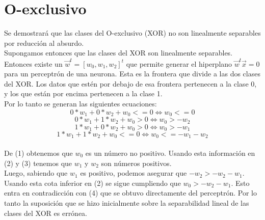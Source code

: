 \documentclass[a4paper]{article}
\begin{document}
\section{O-exclusivo}
Se demostrará que las clases del O-exclusivo (XOR) no son linealmente separables por reducción al absurdo.\\

Supongamos entonces que las clases del XOR son linealmente separables. Entonces existe un $\vec{w}^{t} = [w_{0}, w_{1}, w_{2}]^{t}$ que permite generar el hiperplano $\vec{w}^{t}\vec{x} = 0$ para un perceptrón de una neurona. Esta es la frontera que divide a las dos clases del XOR. Los datos que estén por debajo de esa frontera pertenecen a la clase 0, y los que están por encima pertenecen a la clase 1.\\

Por lo tanto se generan las siguientes ecuaciones:\\
\begin{equation}
0*w_{1} + 0*w_{2} + w_{0} <= 0 \iff w_{0} <= 0
\end{equation}
\begin{equation}
0*w_{1} + 1*w_{2} + w_{0} > 0 \iff w_{0} > -w_{2}
\end{equation}
\begin{equation}
1*w_{1} + 0*w_{2} + w_{0} > 0 \iff w_{0} > -w_{1}
\end{equation}
\begin{equation}
1*w_{1} + 1*w_{2} + w_{0} <= 0 \iff w_{0} <= -w_{1} - w_{2}
\end{equation}\\

De (1) obtenemos que $w_{0}$ es un número no positivo. Usando esta información en (2) y (3) tenemos que $w_{1}$ y $w_{2}$ son números positivos. \\

Luego, sabiendo que $w_{1}$ es positivo, podemos asegurar que $-w_{2} > -w_{2} -w_{1}$. Usando esta cota inferior en (2) se sigue cumpliendo que $w_{0} > -w_{2} - w_{1}$. Esto entra en contradicción con (4) que se obtuvo directamente del perceptrón. Por lo tanto la suposición que se hizo inicialmente sobre la separabilidad lineal de las clases del XOR es errónea.
\end{document}
